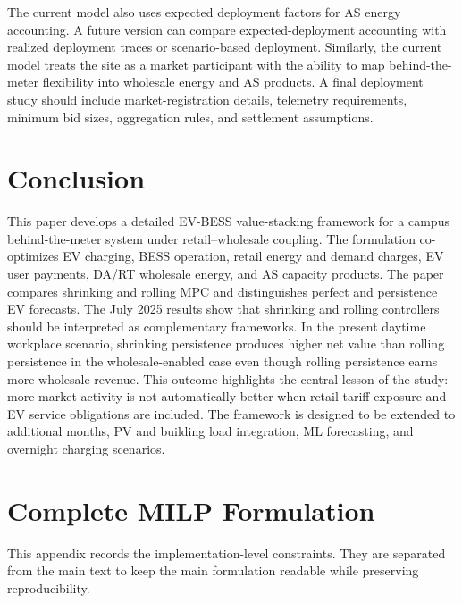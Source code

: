 \documentclass[final,5p,times]{elsarticle}
\begin{document}
The current model also uses expected deployment factors for AS energy accounting. A future version can compare expected-deployment accounting with realized deployment traces or scenario-based deployment. Similarly, the current model treats the site as a market participant with the ability to map behind-the-meter flexibility into wholesale energy and AS products. A final deployment study should include market-registration details, telemetry requirements, minimum bid sizes, aggregation rules, and settlement assumptions.

\section{Conclusion}
\label{sec:conclusion}

This paper develops a detailed EV-BESS value-stacking framework for a campus behind-the-meter system under retail--wholesale coupling. The formulation co-optimizes EV charging, BESS operation, retail energy and demand charges, EV user payments, DA/RT wholesale energy, and AS capacity products. The paper compares shrinking and rolling MPC and distinguishes perfect and persistence EV forecasts. The July 2025 results show that shrinking and rolling controllers should be interpreted as complementary frameworks. In the present daytime workplace scenario, shrinking persistence produces higher net value than rolling persistence in the wholesale-enabled case even though rolling persistence earns more wholesale revenue. This outcome highlights the central lesson of the study: more market activity is not automatically better when retail tariff exposure and EV service obligations are included. The framework is designed to be extended to additional months, PV and building load integration, ML forecasting, and overnight charging scenarios.

\appendix
\section{Complete MILP Formulation}
\label{app:complete_milp}

This appendix records the implementation-level constraints. They are separated from the main text to keep the main formulation readable while preserving reproducibility.
\end{document}
